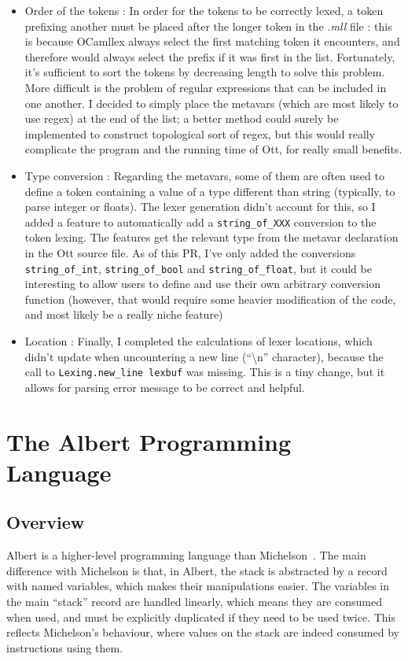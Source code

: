 \documentclass{report}
\begin{document}
\begin{itemize}
\item Order of the tokens : In order for the tokens to be correctly lexed, a token prefixing another must be placed after the longer token in the \textit{.mll} file : this is because OCamllex always select the first matching token it encounters, and therefore would always select the prefix if it was first in the list. Fortunately, it's sufficient to sort the tokens by decreasing length to solve this problem. More difficult is the problem of regular expressions that can be included in one another. I decided to simply place the metavars (which are most likely to use regex) at the end of the list; a better method could surely be implemented to construct topological sort of regex, but this would really complicate the program and the running time of Ott, for really small benefits.
\item Type conversion : Regarding the metavars, some of them are often used to define a token containing a value of a type different than string (typically, to parse integer or floats). The lexer generation didn't account for this, so I added a feature to automatically add a \texttt{string\_of\_XXX} conversion to the token lexing. The features get the relevant type from the metavar declaration in the Ott source file. As of this PR, I've only added the conversions \texttt{string\_of\_int}, \texttt{string\_of\_bool} and \texttt{string\_of\_float}, but it could be interesting to allow users to define and use their own arbitrary conversion function (however, that would require some heavier modification of the code, and most likely be a really niche feature)
\item Location : Finally, I completed the calculations of lexer locations, which didn't update when uncountering a new line (``\textbackslash n'' character), because the call to \texttt{Lexing.new\_line lexbuf} was missing. This is a tiny change, but it allows for parsing error message to be correct and helpful.
\end{itemize}

\chapter{The Albert Programming Language}

\section{Overview}

Albert is a higher-level programming language than Michelson~\cite{albertProposal}. The main difference with Michelson is that, in Albert, the stack is abstracted by a record with named variables, which makes their manipulations easier. The variables in the main ``stack'' record are handled linearly, which means they are consumed when used, and must be explicitly duplicated if they need to be used twice. This reflects Michelson's behaviour, where values on the stack are indeed consumed by instructions using them.\\
\end{document}
